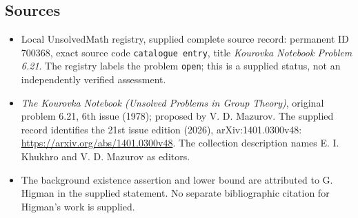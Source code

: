 \documentclass[11pt]{article}
\begin{document}
\subsection{Sources}
\begin{itemize}
\item Local UnsolvedMath registry, supplied complete source record: permanent ID \(700368\), exact source code \texttt{catalogue entry}, title \emph{Kourovka Notebook Problem 6.21}. The registry labels the problem \texttt{open}; this is a supplied status, not an independently verified assessment.
\item \emph{The Kourovka Notebook (Unsolved Problems in Group Theory)}, original problem 6.21, 6th issue (1978); proposed by V. D. Mazurov. The supplied record identifies the 21st issue edition (2026), arXiv:1401.0300v48: \url{https://arxiv.org/abs/1401.0300v48}. The collection description names E. I. Khukhro and V. D. Mazurov as editors.
\item The background existence assertion and lower bound are attributed to G. Higman in the supplied statement. No separate bibliographic citation for Higman's work is supplied.
\end{itemize}
\end{document}
